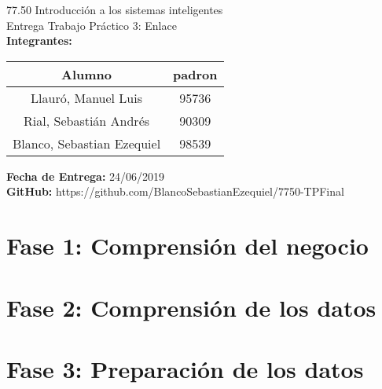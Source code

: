 
%

		
	\begin{titlepage}
		\vspace*{\fill}
		\begin{center}
			\Large 77.50 Introducción a los sistemas inteligentes \\
			\Huge Entrega Trabajo Práctico 3: Enlace \\
			\bigskip\bigskip\bigskip
			\large\textbf{Integrantes:} \\
			\begin{center}
				\begin{tabular}{||c | c||} 
					\hline
					Alumno & padron \\ [0.5ex] 
					\hline\hline
					Llauró, Manuel Luis & 95736 \\
					\hline
					Rial, Sebastián Andrés & 90309 \\
					\hline
					Blanco, Sebastian Ezequiel & 98539 \\
					\hline
				\end{tabular}
			\end{center}
			\textbf{Fecha de Entrega:} 24/06/2019\\
			\textbf{GitHub:} https://github.com/BlancoSebastianEzequiel/7750-TPFinal\\

		\end{center}
		\vspace*{\fill}
	\end{titlepage}
	\newpage
			
	\tableofcontents
	\newpage
	\section{Fase 1: Comprensión del negocio}
		

	\newpage
	\section{Fase 2: Comprensión de los datos}
		

	\newpage
	\section{Fase 3: Preparación de los datos}
		

